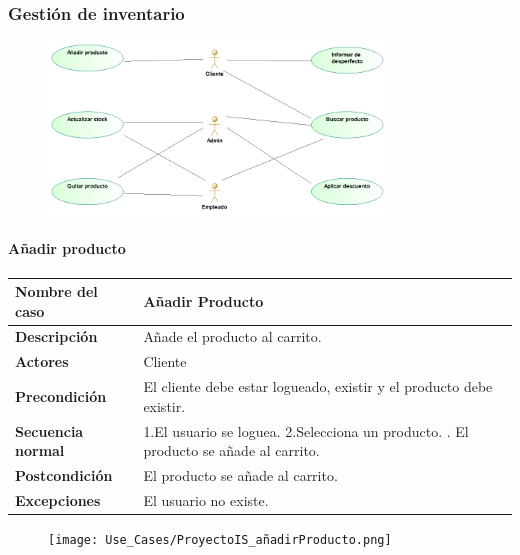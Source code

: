 \subsubsection{Gestión de inventario}
\begin{figure}[H]
	\centering
	\includegraphics[width = 0.8\textwidth]{Use_Cases/gestion_de_inventario.png}
\end{figure}
\newpage
\paragraph{Añadir producto}
\begin{table}[H]
	\centering
	\small
	\begin{tabularx}{0.8\textwidth}{|p{3.5cm}|X|}
		\hline
		\rowcolor{lightgray}
		\textbf{Nombre del caso}  & \textbf{Añadir Producto}                                            \\
		\hline
		\textbf{Descripción}      & Añade el producto al carrito.                                       \\
		\hline
		\textbf{Actores}          & Cliente                                                             \\
		\hline
		\textbf{Precondición}     & El cliente debe estar logueado, existir y el producto debe existir. \\
		\hline
		\textbf{Secuencia normal} & 1.El usuario se loguea. \newline
		2.Selecciona un producto. \newline
		3. El producto se añade al carrito.                                                             \\
		\hline
		\textbf{Postcondición}    & El producto se añade al carrito.                                    \\
		\hline
		\textbf{Excepciones}      & El usuario no existe.                                               \\
		\hline
	\end{tabularx}
\end{table}
\begin{figure}[H]
	\centering
	\texttt{[image: Use\_Cases/ProyectoIS\_añadirProducto.png]}
\end{figure}
\newpage
